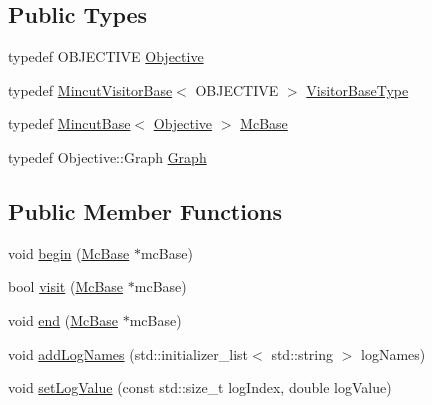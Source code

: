 \subsection*{Public Types}
\begin{DoxyCompactItemize}
\item 
typedef O\+B\+J\+E\+C\+T\+I\+V\+E \hyperlink{classnifty_1_1graph_1_1optimization_1_1mincut_1_1PyMincutVisitorBase_a9c7747e47d6211e3db9bbb6d181d66c2}{Objective}
\item 
typedef \hyperlink{namespacenifty_1_1graph_1_1optimization_1_1mincut_a95cebea00c03e9d82bf37342468c1fd9}{Mincut\+Visitor\+Base}$<$ O\+B\+J\+E\+C\+T\+I\+V\+E $>$ \hyperlink{classnifty_1_1graph_1_1optimization_1_1mincut_1_1PyMincutVisitorBase_af95408b02f41443ea9506434d4106949}{Visitor\+Base\+Type}
\item 
typedef \hyperlink{classnifty_1_1graph_1_1optimization_1_1mincut_1_1MincutBase}{Mincut\+Base}$<$ \hyperlink{classnifty_1_1graph_1_1optimization_1_1mincut_1_1PyMincutVisitorBase_a9c7747e47d6211e3db9bbb6d181d66c2}{Objective} $>$ \hyperlink{classnifty_1_1graph_1_1optimization_1_1mincut_1_1PyMincutVisitorBase_ab1309040c1e0106d47616facaf55aec8}{Mc\+Base}
\item 
typedef Objective\+::\+Graph \hyperlink{classnifty_1_1graph_1_1optimization_1_1mincut_1_1PyMincutVisitorBase_a88185164062a6c0b2a2d24bdde71ee6c}{Graph}
\end{DoxyCompactItemize}
\subsection*{Public Member Functions}
\begin{DoxyCompactItemize}
\item 
void \hyperlink{classnifty_1_1graph_1_1optimization_1_1mincut_1_1PyMincutVisitorBase_a7dc3479e0472035557a7a27fb60dba02}{begin} (\hyperlink{classnifty_1_1graph_1_1optimization_1_1mincut_1_1PyMincutVisitorBase_ab1309040c1e0106d47616facaf55aec8}{Mc\+Base} $\ast$mc\+Base)
\item 
bool \hyperlink{classnifty_1_1graph_1_1optimization_1_1mincut_1_1PyMincutVisitorBase_a2c941b20434baf6eb007aca7fb755240}{visit} (\hyperlink{classnifty_1_1graph_1_1optimization_1_1mincut_1_1PyMincutVisitorBase_ab1309040c1e0106d47616facaf55aec8}{Mc\+Base} $\ast$mc\+Base)
\item 
void \hyperlink{classnifty_1_1graph_1_1optimization_1_1mincut_1_1PyMincutVisitorBase_a1e146652a2ed11b0076bcc938d6ac5b7}{end} (\hyperlink{classnifty_1_1graph_1_1optimization_1_1mincut_1_1PyMincutVisitorBase_ab1309040c1e0106d47616facaf55aec8}{Mc\+Base} $\ast$mc\+Base)
\item 
void \hyperlink{classnifty_1_1graph_1_1optimization_1_1mincut_1_1PyMincutVisitorBase_ac8911aa341b2e5d7920ff7a86de21f35}{add\+Log\+Names} (std\+::initializer\+\_\+list$<$ std\+::string $>$ log\+Names)
\item 
void \hyperlink{classnifty_1_1graph_1_1optimization_1_1mincut_1_1PyMincutVisitorBase_a08ad6e45f4bf5f0129a5943f35eafe2d}{set\+Log\+Value} (const std\+::size\+\_\+t log\+Index, double log\+Value)
\end{DoxyCompactItemize}


